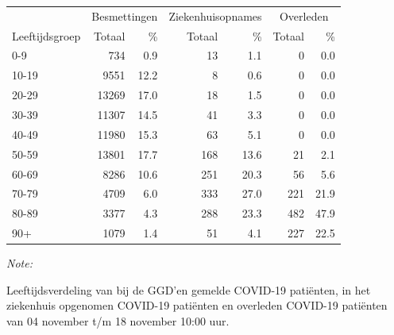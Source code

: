 \documentclass[
  english,
  man,floatsintext]{apa6}
\begin{document}
\begin{table}[H]
\centering\begingroup\fontsize{11}{13}\selectfont

\begin{threeparttable}
\begin{tabular}{lrrrrrr}
\toprule
\multicolumn{1}{c}{ } & \multicolumn{2}{c}{Besmettingen} & \multicolumn{2}{c}{Ziekenhuisopnames} & \multicolumn{2}{c}{Overleden} \\
\cmidrule(l{3pt}r{3pt}){2-3} \cmidrule(l{3pt}r{3pt}){4-5} \cmidrule(l{3pt}r{3pt}){6-7}
Leeftijdsgroep & Totaal & \% & Totaal & \% & Totaal & \%\\
\midrule
0-9 & 734 & 0.9 & 13 & 1.1 & 0 & 0.0\\
10-19 & 9551 & 12.2 & 8 & 0.6 & 0 & 0.0\\
20-29 & 13269 & 17.0 & 18 & 1.5 & 0 & 0.0\\
30-39 & 11307 & 14.5 & 41 & 3.3 & 0 & 0.0\\
40-49 & 11980 & 15.3 & 63 & 5.1 & 0 & 0.0\\
50-59 & 13801 & 17.7 & 168 & 13.6 & 21 & 2.1\\
60-69 & 8286 & 10.6 & 251 & 20.3 & 56 & 5.6\\
70-79 & 4709 & 6.0 & 333 & 27.0 & 221 & 21.9\\
80-89 & 3377 & 4.3 & 288 & 23.3 & 482 & 47.9\\
90+ & 1079 & 1.4 & 51 & 4.1 & 227 & 22.5\\
\bottomrule
\end{tabular}
\begin{tablenotes}
\item \textit{Note: } 
\item Leeftijdsverdeling van bij de GGD’en gemelde COVID-19 patiënten, in het ziekenhuis opgenomen COVID-19 patiënten en overleden COVID-19 patiënten van 04 november t/m 18 november 10:00 uur.
\end{tablenotes}
\end{threeparttable}
\endgroup{}
\end{table}
\end{document}
